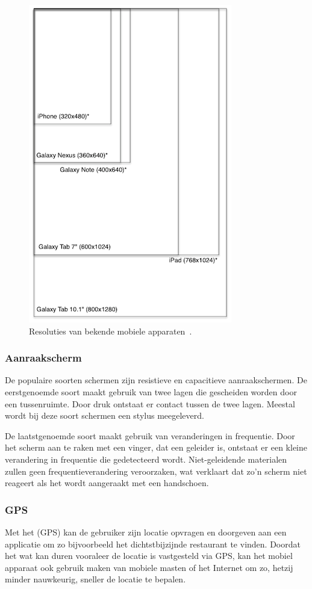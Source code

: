 \begin{figure}
  \centering
  \includegraphics[height=0.8\textwidth]{figuren/mobile-devices-resolutions.png}
  \caption{Resoluties van bekende mobiele apparaten~\cite{Wolfermann2012}.}
  \label{fig:resoluties}
\end{figure}

\subsubsection{Aanraakscherm}
De populaire soorten schermen zijn resistieve en capacitieve aanraakschermen. 
De eerstgenoemde soort maakt gebruik van twee lagen die gescheiden worden door een tussenruimte. Door druk ontstaat er contact tussen de twee lagen. 
Meestal wordt bij deze soort schermen een stylus meegeleverd. 

De laatstgenoemde soort maakt gebruik van veranderingen in frequentie. 
Door het scherm aan te raken met een vinger, dat een geleider is, ontstaat er een kleine verandering in frequentie die gedetecteerd wordt. 
Niet-geleidende materialen zullen geen frequentieverandering veroorzaken, wat verklaart dat zo'n scherm niet reageert als het wordt aangeraakt met een handschoen.

\subsubsection{GPS}
Met het  (GPS) kan de gebruiker zijn locatie opvragen en doorgeven aan een applicatie om zo bijvoorbeeld het dichtstbijzijnde restaurant te vinden. 
Doordat het wat kan duren vooraleer de locatie is vastgesteld via GPS, kan het mobiel apparaat ook gebruik maken van mobiele masten of het Internet om zo, hetzij minder nauwkeurig, sneller de locatie te bepalen.

